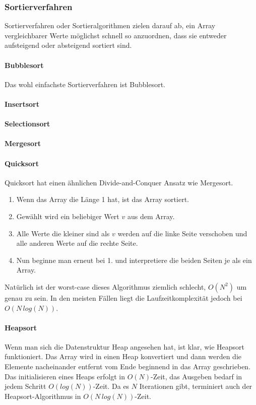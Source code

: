 \documentclass{article}
\begin{document}
\subsubsection{Sortierverfahren}
Sortierverfahren oder Sortieralgorithmen zielen darauf ab, ein Array vergleichbarer Werte möglichst schnell so anzuordnen, dass sie entweder aufsteigend oder absteigend sortiert sind. 
\paragraph{Bubblesort}
Das wohl einfachste Sortierverfahren ist Bubblesort. 
\paragraph{Insertsort}
\paragraph{Selectionsort}
\paragraph{Mergesort}
\paragraph{Quicksort}
Quicksort hat einen ähnlichen Divide-and-Conquer Ansatz wie Mergesort. 
\begin{enumerate}
    \item Wenn das Array die Länge 1 hat, ist das Array sortiert.
    \item Gewählt wird ein beliebiger Wert $v$ aus dem Array.
    \item Alle Werte die kleiner sind als $v$ werden auf die linke Seite verschoben und alle anderen Werte auf die rechte Seite.
    \item Nun beginne man erneut bei 1. und interpretiere die beiden Seiten je als ein Array.
\end{enumerate}
Natürlich ist der worst-case dieses Algorithmus ziemlich schlecht, $O(N^2)$ um genau zu sein. In den meisten Fällen liegt die Laufzeitkomplexität jedoch bei $O(N\,log(N))$.
\paragraph{Heapsort}
Wenn man sich die Datenstruktur Heap angesehen hat, ist klar, wie Heapsort funktioniert. Das Array wird in einen Heap konvertiert und dann werden die Elemente nacheinander entfernt vom Ende beginnend in das Array geschrieben.\\
Das initialisieren eines Heaps erfolgt in $O(N)$-Zeit, das Ausgeben bedarf in jedem Schritt $O(log(N))$-Zeit. Da es $N$ Iterationen gibt, terminiert auch der Heapsort-Algorithmus in $O(N\,log(N))$-Zeit.
\end{document}
